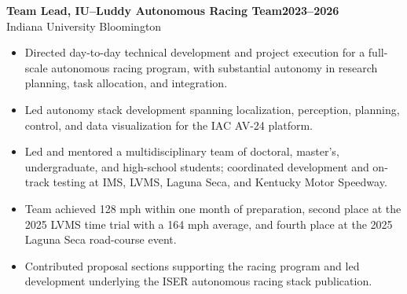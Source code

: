 \documentclass[11pt,letterpaper]{article}
\newcommand{\entry}[3]{\Needspace{4\baselineskip}\textbf{#1}\hfill\textbf{#2}\\#3\par}
\begin{document}
\entry{Team Lead, IU--Luddy Autonomous Racing Team}{2023--2026}{Indiana University Bloomington}
\begin{itemize}
\item Directed day-to-day technical development and project execution for a full-scale autonomous racing program, with substantial autonomy in research planning, task allocation, and integration.
\item Led autonomy stack development spanning localization, perception, planning, control, and data visualization for the IAC AV-24 platform.
\item Led and mentored a multidisciplinary team of doctoral, master's, undergraduate, and high-school students; coordinated development and on-track testing at IMS, LVMS, Laguna Seca, and Kentucky Motor Speedway.
\item Team achieved 128 mph within one month of preparation, second place at the 2025 LVMS time trial with a 164 mph average, and fourth place at the 2025 Laguna Seca road-course event.
\item Contributed proposal sections supporting the racing program and led development underlying the ISER autonomous racing stack publication.
\end{itemize}

\newpage
\end{document}
